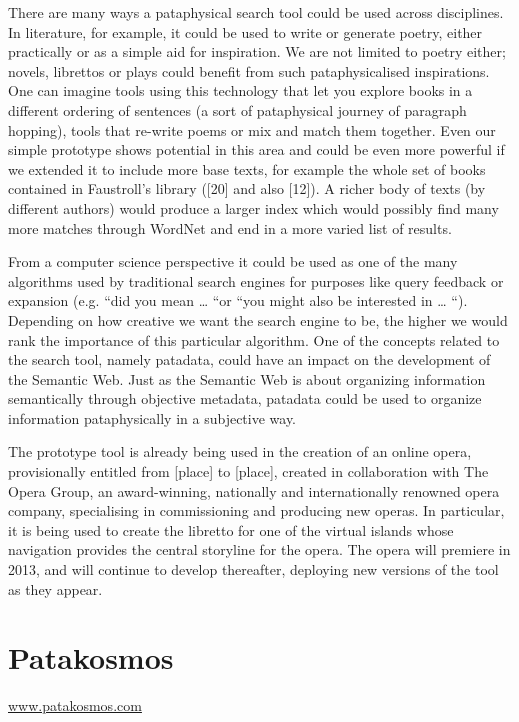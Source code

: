 There are many ways a pataphysical search tool could be used across disciplines.
In literature, for example, it could be used to write or generate poetry, either practically or as a simple aid for inspiration. We are not limited to poetry either; novels, librettos or plays could benefit from such pataphysicalised inspirations. One can imagine tools using this technology that let you explore books in a different ordering of sentences (a sort of pataphysical journey of paragraph hopping), tools that re-write poems or mix and match them together. Even our simple prototype shows potential in this area and could be even more powerful if we extended it to include more base texts, for example the whole set of books contained in Faustroll’s library ([20] and also [12]). A richer body of texts (by different authors) would produce a larger index which would possibly find many more matches through WordNet and end in a more varied list of results.

From a computer science perspective it could be used as one of the many algorithms used by traditional search engines for purposes like query feedback or expansion (e.g. “did you mean … “or “you might also be interested in … “). Depending on how creative we want the search engine to be, the higher we would rank the importance of this particular algorithm. One of the concepts related to the search tool, namely patadata, could have an impact on the development of the Semantic Web. Just as the Semantic Web is about organizing information semantically through objective metadata, patadata could be used to organize information pataphysically in a subjective way.

The prototype tool is already being used in the creation of an online opera, provisionally entitled from [place] to [place], created in collaboration with The Opera Group, an award-winning, nationally and internationally renowned opera company, specialising in commissioning and producing new operas. In particular, it is being used to create the libretto for one of the virtual islands whose navigation provides the central storyline for the opera. The opera will premiere in 2013, and will continue to develop thereafter, deploying new versions of the tool as they appear.


\section{Patakosmos}

\url{www.patakosmos.com}

